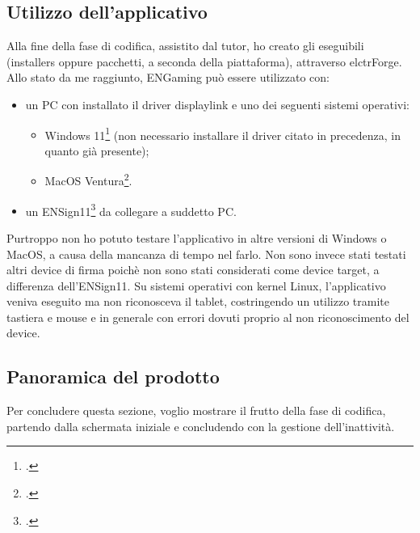 \newpage
\subsection{Utilizzo dell'applicativo}
Alla fine della fase di codifica, assistito dal tutor, ho creato gli eseguibili (installers oppure pacchetti, a seconda della piattaforma), attraverso \Gls{elctrForge}.
Allo stato da me raggiunto, ENGaming può essere utilizzato con:
\begin{itemize}
    \item un PC con installato il driver \gls{displaylink} e uno dei seguenti sistemi operativi: \begin{itemize}
    \item Windows 11\footcite{site:w11} (non necessario installare il driver citato in precedenza, in quanto già presente);
    \item MacOS Ventura\footcite{site:macosVentura}.
    \end{itemize}
    \item un ENSign11\footcite{site:ensign11} da collegare a suddetto PC.
\end{itemize}
Purtroppo non ho potuto testare l'applicativo in altre versioni di Windows o MacOS, a causa della mancanza di tempo nel farlo. Non sono invece stati testati altri device di firma poichè non sono stati considerati come device target, a differenza dell'ENSign11.
Su sistemi operativi con kernel Linux, l'applicativo veniva eseguito ma non riconosceva il tablet, costringendo un utilizzo tramite tastiera e mouse e in generale con errori dovuti proprio al non riconoscimento del device.
\newpage
\subsection{Panoramica del prodotto}
\label{subsec:panoramicaProdotto}
Per concludere questa sezione, voglio mostrare il frutto della fase di codifica, partendo dalla schermata iniziale e concludendo con la gestione dell'inattività.
